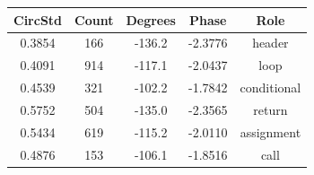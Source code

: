 \begin{table}[h]
\centering
\begin{tabular}{ |c|c|c|c|c| }
\hline
CircStd & Count & Degrees & Phase & Role \\
\hline
0.3854 & 166 & -136.2 & -2.3776 & header \\
\hline
0.4091 & 914 & -117.1 & -2.0437 & loop \\
\hline
0.4539 & 321 & -102.2 & -1.7842 & conditional \\
\hline
0.5752 & 504 & -135.0 & -2.3565 & return \\
\hline
0.5434 & 619 & -115.2 & -2.0110 & assignment \\
\hline
0.4876 & 153 & -106.1 & -1.8516 & call \\
\hline
\end{tabular}
\end{table}

